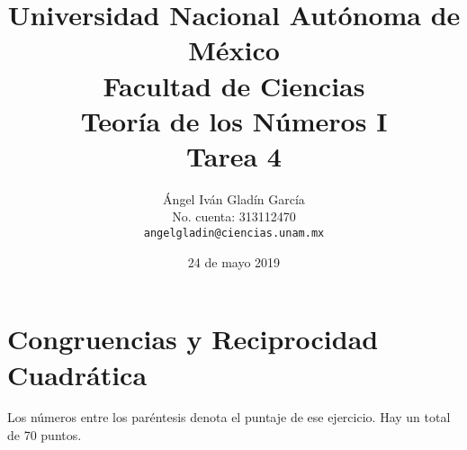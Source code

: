 \documentclass[11pt,letterpaper]{article}
\theoremstyle{definition}\newtheorem{p}{Ejercicio}
\begin{document}
\title{
    \vspace{-2cm}
        Universidad Nacional Autónoma de México\\
        Facultad de Ciencias\\
        Teoría de los Números I\\
    \vspace{.5cm}
    \large
        \textbf{Tarea 4}\\
}
\author{
    Ángel Iván Gladín García\\
    No. cuenta: 313112470\\
    \texttt{angelgladin@ciencias.unam.mx}
}
\date{24 de mayo 2019}
\maketitle

\newtheorem{theorem}{Teorema}
\newtheorem{example}{Ejemplo}
\newtheorem{corollary}{Corolario}
\newtheorem{lemma}{Lemma}
\newtheorem{definition}{Definición}
\newtheorem{prop}{Proposición}



\section*{Congruencias y Reciprocidad Cuadrática}
Los n\'umeros entre los par\'entesis denota el puntaje de ese ejercicio. Hay un total de 70 puntos.
\end{document}
